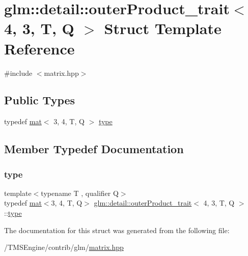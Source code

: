 \hypertarget{structglm_1_1detail_1_1outer_product__trait_3_014_00_013_00_01_t_00_01_q_01_4}{}\section{glm\+:\+:detail\+:\+:outer\+Product\+\_\+trait$<$ 4, 3, T, Q $>$ Struct Template Reference}
\label{structglm_1_1detail_1_1outer_product__trait_3_014_00_013_00_01_t_00_01_q_01_4}


{\ttfamily \#include $<$matrix.\+hpp$>$}

\subsection*{Public Types}
\begin{DoxyCompactItemize}
\item 
typedef \hyperlink{structglm_1_1mat}{mat}$<$ 3, 4, T, Q $>$ \hyperlink{structglm_1_1detail_1_1outer_product__trait_3_014_00_013_00_01_t_00_01_q_01_4_ac976110a09c606311b8abe8cb48cb437}{type}
\end{DoxyCompactItemize}


\subsection{Member Typedef Documentation}
\mbox{\label{structglm_1_1detail_1_1outer_product__trait_3_014_00_013_00_01_t_00_01_q_01_4_ac976110a09c606311b8abe8cb48cb437}} 
\subsubsection{\texorpdfstring{type}{type}}
{\footnotesize\ttfamily template$<$typename T , qualifier Q$>$ \\
typedef \hyperlink{structglm_1_1mat}{mat}$<$3, 4, T, Q$>$ \hyperlink{structglm_1_1detail_1_1outer_product__trait}{glm\+::detail\+::outer\+Product\+\_\+trait}$<$ 4, 3, T, Q $>$\+::\hyperlink{structglm_1_1detail_1_1outer_product__trait_3_014_00_013_00_01_t_00_01_q_01_4_ac976110a09c606311b8abe8cb48cb437}{type}}



The documentation for this struct was generated from the following file\+:\begin{DoxyCompactItemize}
\item 
/\+T\+M\+S\+Engine/contrib/glm/\hyperlink{matrix_8hpp}{matrix.\+hpp}\end{DoxyCompactItemize}
